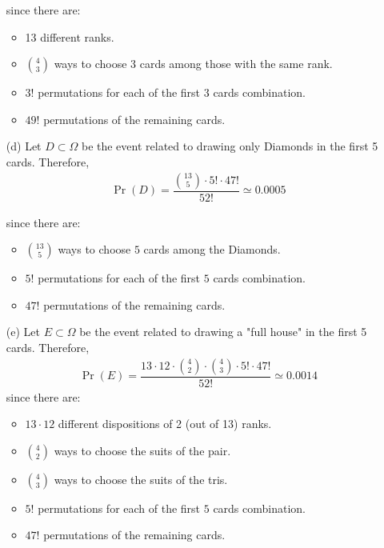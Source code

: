 \begin{itemize}
	since there are:
	\begin{itemize}
		\item 13 different ranks.
		\item $\binom{4}{3}$ ways to choose 3 cards among those with the same rank.
		\item $3!$ permutations for each of the first $3$ cards combination.
		\item $49!$ permutations of the remaining cards.
	\end{itemize}
	
	\item[(d)] Let $D \subset \Omega$ be the event related to drawing only Diamonds in the first 5 cards. Therefore,
	\begin{align*}
		\Pr(D) = \dfrac{\binom{13}{5} \cdot 5! \cdot 47!}{52!} \simeq 0.0005
	\end{align*}
	
	since there are:
	\begin{itemize}
		\item $\binom{13}{5}$ ways to choose $5$ cards among the Diamonds.
		\item $5!$ permutations for each of the first $5$ cards combination.
		\item $47!$ permutations of the remaining cards.
	\end{itemize}
	
	\item[(e)] Let $E \subset \Omega$ be the event related to drawing a "full house" in the first 5 cards. Therefore,
	\begin{align*}
		\Pr(E) = \dfrac{13 \cdot 12 \cdot \binom{4}{2} \cdot \binom{4}{3} \cdot 5! \cdot 47!}{52!} \simeq 0.0014
	\end{align*}
	since there are:
	\begin{itemize}
		\item $13 \cdot 12$ different dispositions of 2 (out of 13) ranks.
		\item $\binom{4}{2}$ ways to choose the suits of the pair.
		\item $\binom{4}{3}$ ways to choose the suits of the tris.
		\item $5!$ permutations for each of the first $5$ cards combination.
		\item $47!$ permutations of the remaining cards.
	\end{itemize}		
\end{itemize}


